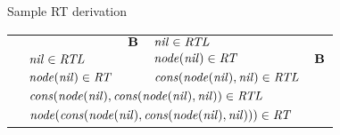 \begin{wideslide}[bm=,toc=]{Sample RT derivation}
\begin{center}
\begin{tabular}{llllll}
  \onslide{2-}{             &                                 & $\bid{B}$ & $\id{nil}\in\id{RTL}$           &                       &} 
  \onslide{3-}{\\ \cline{4-4}} 
  \onslide{4-}{$\bid{B}$  & $\id{nil}\in\id{RTL}$}
  &\onslide{3-}{$\bid{R2}$             & $\mbox{\it node\/}(\mbox{\it nil\/})\in\mbox{\it RT\/}$} & \onslide{4-}{$\id{nil}\in\id{RTL}$ & $\bid{B}$} 
  \onslide{5-}{\\ \cline{2-2} \cline{4-5}}
  \onslide{6-}{$\bid{R2}$ & $\mbox{\it node\/}(\mbox{\it nil\/})\in\mbox{\it RT\/}$} & \onslide{7-}{$\bid{R1}$ & \multicolumn{2}{l}{ $\mbox{\it cons\/}(\mbox{\it node\/}(\mbox{\it nil\/}),\mbox{\it nil\/})\in\mbox{\it RTL\/}$} &} 
  \onslide{8-}{\\ \cline{2-5}}
  \onslide{9-}{$\bid{R1}$ & \multicolumn{4}{l}{$\mbox{\it cons\/}(\mbox{\it node\/}(\mbox{\it nil\/}),\mbox{\it cons\/}(\mbox{\it node\/}(\mbox{\it nil\/}),\mbox{\it nil\/}))
      \in \mbox{\it RTL\/}$}} 
  \onslide{10-}{ \\ \cline{2-5}}
  \onslide{11-}{$\bid{R2}$ & \multicolumn{4}{l}{$\mbox{\it node\/}(\mbox{\it cons\/}(\mbox{\it node\/}(\mbox{\it nil\/}),\mbox{\it cons\/}(\mbox{\it node\/}(\mbox{\it nil\/}),\mbox{\it nil\/})))\in\mbox{\it RT\/}$}}
\end{tabular}
\end{center}
\end{wideslide}

